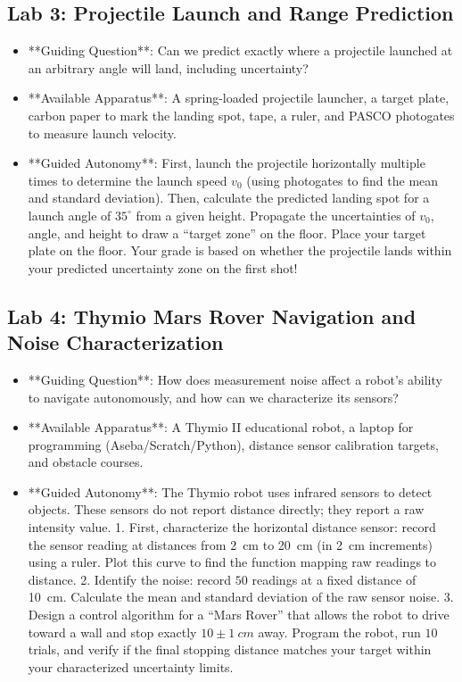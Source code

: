 \subsection{Lab 3: Projectile Launch and Range Prediction}
\begin{itemize}
  \item **Guiding Question**: Can we predict exactly where a projectile launched at an arbitrary angle will land, including uncertainty?
  \item **Available Apparatus**: A spring-loaded projectile launcher, a target plate, carbon paper to mark the landing spot, tape, a ruler, and PASCO photogates to measure launch velocity.
  \item **Guided Autonomy**: First, launch the projectile horizontally multiple times to determine the launch speed $v_0$ (using photogates to find the mean and standard deviation). Then, calculate the predicted landing spot for a launch angle of $35^\circ$ from a given height. Propagate the uncertainties of $v_0$, angle, and height to draw a ``target zone'' on the floor. Place your target plate on the floor. Your grade is based on whether the projectile lands within your predicted uncertainty zone on the first shot!
\end{itemize}

\subsection{Lab 4: Thymio Mars Rover Navigation and Noise Characterization}
\begin{itemize}
  \item **Guiding Question**: How does measurement noise affect a robot's ability to navigate autonomously, and how can we characterize its sensors?
  \item **Available Apparatus**: A Thymio II educational robot, a laptop for programming (Aseba/Scratch/Python), distance sensor calibration targets, and obstacle courses.
  \item **Guided Autonomy**: The Thymio robot uses infrared sensors to detect objects. These sensors do not report distance directly; they report a raw intensity value. 
        1. First, characterize the horizontal distance sensor: record the sensor reading at distances from \SI{2}{cm} to \SI{20}{cm} (in \SI{2}{cm} increments) using a ruler. Plot this curve to find the function mapping raw readings to distance.
        2. Identify the noise: record $50$ readings at a fixed distance of \SI{10}{cm}. Calculate the mean and standard deviation of the raw sensor noise.
        3. Design a control algorithm for a ``Mars Rover'' that allows the robot to drive toward a wall and stop exactly $10 \pm \SI{1}{cm}$ away. Program the robot, run $10$ trials, and verify if the final stopping distance matches your target within your characterized uncertainty limits.
\end{itemize}


